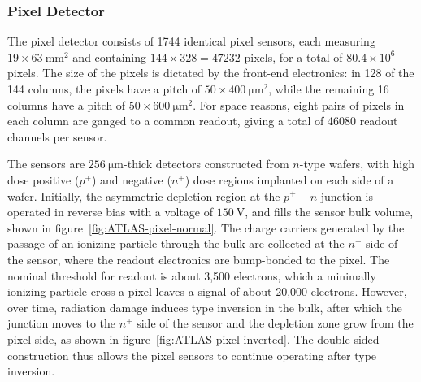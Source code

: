 \subsubsection{Pixel Detector}\label{sec:ATLAS-id-pixel-detector}

The pixel detector consists of 1744 identical pixel sensors, each measuring $19\times\SI{63}{\milli\meter\tothe{2}}$ and containing $144\times 328=47232$ pixels, for a total of $80.4\times 10^6$ pixels. The size of the pixels is dictated by the front-end electronics: in 128 of the 144 columns, the pixels have a pitch of $50\times \SI{400}{\micro\meter\tothe{2}}$, while the remaining 16 columns have a pitch of $50\times \SI{600}{\micro\meter\tothe{2}}$. For space reasons, eight pairs of pixels in each column are ganged to a common readout, giving a total of 46080 readout channels per sensor.

 The sensors are $\SI{256}{\micro\meter}$-thick detectors constructed from $n$-type wafers, with high dose positive ($p^+$) and negative ($n^+$) dose regions implanted on each side of a wafer. Initially, the asymmetric depletion region at the $p^+-n$ junction is operated in reverse bias with a voltage of $\SI{150}{\volt}$, and fills the sensor bulk volume, shown in figure~\ref{fig:ATLAS-pixel-normal}. The charge carriers generated by the passage of an ionizing particle through the bulk are collected at the $n^+$ side of the sensor, where the readout electronics are bump-bonded to the pixel. The nominal threshold for readout is about 3,500 electrons, which a minimally ionizing particle cross a pixel leaves a signal of about 20,000 electrons. However, over time, radiation damage induces type inversion in the bulk, after which the junction moves to the $n^+$ side of the sensor and the depletion zone grow from the pixel side, as shown in figure~\ref{fig:ATLAS-pixel-inverted}. The double-sided construction thus allows the pixel sensors to continue operating after type inversion.

